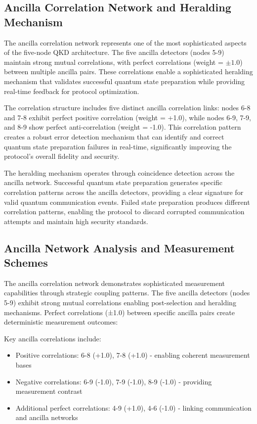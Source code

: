 \documentclass[11pt,a4paper]{article}
\begin{document}
\subsection{Ancilla Correlation Network and Heralding Mechanism}

The ancilla correlation network represents one of the most sophisticated aspects of the five-node QKD architecture. The five ancilla detectors (nodes 5-9) maintain strong mutual correlations, with perfect correlations (weight = $\pm 1.0$) between multiple ancilla pairs. These correlations enable a sophisticated heralding mechanism that validates successful quantum state preparation while providing real-time feedback for protocol optimization.

The correlation structure includes five distinct ancilla correlation links: nodes 6-8 and 7-8 exhibit perfect positive correlation (weight = +1.0), while nodes 6-9, 7-9, and 8-9 show perfect anti-correlation (weight = -1.0). This correlation pattern creates a robust error detection mechanism that can identify and correct quantum state preparation failures in real-time, significantly improving the protocol's overall fidelity and security.

The heralding mechanism operates through coincidence detection across the ancilla network. Successful quantum state preparation generates specific correlation patterns across the ancilla detectors, providing a clear signature for valid quantum communication events. Failed state preparation produces different correlation patterns, enabling the protocol to discard corrupted communication attempts and maintain high security standards.

\subsection{Ancilla Network Analysis and Measurement Schemes}

The ancilla correlation network demonstrates sophisticated measurement capabilities through strategic coupling patterns. The five ancilla detectors (nodes 5-9) exhibit strong mutual correlations enabling post-selection and heralding mechanisms. Perfect correlations (±1.0) between specific ancilla pairs create deterministic measurement outcomes:

Key ancilla correlations include:
\begin{itemize}
\item Positive correlations: 6-8 (+1.0), 7-8 (+1.0) - enabling coherent measurement bases
\item Negative correlations: 6-9 (-1.0), 7-9 (-1.0), 8-9 (-1.0) - providing measurement contrast
\item Additional perfect correlations: 4-9 (+1.0), 4-6 (-1.0) - linking communication and ancilla networks
\end{itemize}
\end{document}
